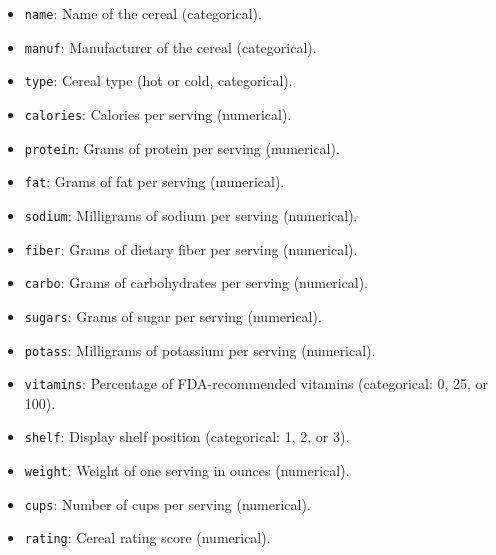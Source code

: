 \documentclass[
  11pt,
]{book}
\newcommand{\passthrough}[1]{#1}
\providecommand{\tightlist}{%
  \setlength{\itemsep}{0pt}\setlength{\parskip}{0pt}}
\theoremstyle{definition}
\theoremstyle{definition}
\theoremstyle{definition}
\theoremstyle{definition}
\theoremstyle{remark}
\begin{document}
\begin{itemize}
\tightlist
\item
  \passthrough{\lstinline!name!}: Name of the cereal (categorical).\\
\item
  \passthrough{\lstinline!manuf!}: Manufacturer of the cereal (categorical).\\
\item
  \passthrough{\lstinline!type!}: Cereal type (hot or cold, categorical).\\
\item
  \passthrough{\lstinline!calories!}: Calories per serving (numerical).\\
\item
  \passthrough{\lstinline!protein!}: Grams of protein per serving (numerical).\\
\item
  \passthrough{\lstinline!fat!}: Grams of fat per serving (numerical).\\
\item
  \passthrough{\lstinline!sodium!}: Milligrams of sodium per serving (numerical).\\
\item
  \passthrough{\lstinline!fiber!}: Grams of dietary fiber per serving (numerical).\\
\item
  \passthrough{\lstinline!carbo!}: Grams of carbohydrates per serving (numerical).\\
\item
  \passthrough{\lstinline!sugars!}: Grams of sugar per serving (numerical).\\
\item
  \passthrough{\lstinline!potass!}: Milligrams of potassium per serving (numerical).\\
\item
  \passthrough{\lstinline!vitamins!}: Percentage of FDA-recommended vitamins (categorical: 0, 25, or 100).\\
\item
  \passthrough{\lstinline!shelf!}: Display shelf position (categorical: 1, 2, or 3).\\
\item
  \passthrough{\lstinline!weight!}: Weight of one serving in ounces (numerical).\\
\item
  \passthrough{\lstinline!cups!}: Number of cups per serving (numerical).\\
\item
  \passthrough{\lstinline!rating!}: Cereal rating score (numerical).
\end{itemize}
\end{document}
